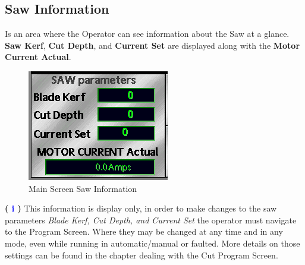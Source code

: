 \subsection{Saw Information}
Is an area where the Operator can see information about the Saw at a glance. \textbf{Saw Kerf}, \textbf{Cut Depth}, and \textbf{Current Set} are displayed along with the \textbf{Motor Current Actual}.
\begin{figure}
	\centering
	\includegraphics[width=.2\linewidth]{screen-captures/main/main-saw-info}
	\caption{Main Screen Saw Information}
	\label{fig:main-sawinfo}
\end{figure}
\textbf{\LARGE ( \textcolor{blue}{i} )} This information is display only, in order to make changes to the saw parameters \textit{Blade Kerf, Cut Depth, and Current Set} the operator must navigate to the Program Screen. Where they may be changed at any time and in any mode, even while running in automatic/manual or faulted. More details on those settings can be found in the chapter dealing with the Cut Program Screen.
\pagebreak
